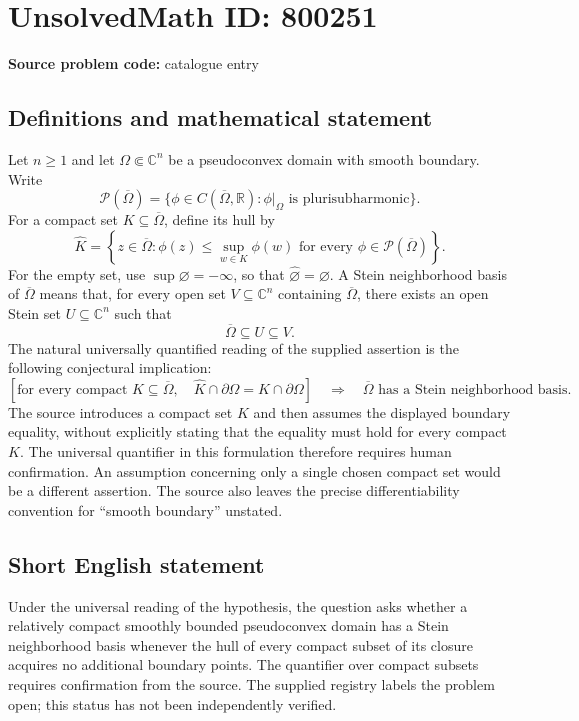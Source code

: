 \documentclass[11pt]{article}
\newcommand{\R}{\mathbb{R}}
\newcommand{\C}{\mathbb{C}}
\begin{document}
\section*{UnsolvedMath ID: 800251}
\textbf{Source problem code:} catalogue entry
\subsection{Definitions and mathematical statement}
Let \(n\geq 1\) and let \(\Omega\Subset\C^n\) be a pseudoconvex domain with smooth boundary. Write
\[
\mathcal P(\overline\Omega)=\{\phi\in C(\overline\Omega,\R):\phi|_\Omega\text{ is plurisubharmonic}\}.
\]
For a compact set \(K\subseteq\overline\Omega\), define its hull by
\[
\widehat K=\left\{z\in\overline\Omega:\phi(z)\leq\sup_{w\in K}\phi(w)\text{ for every }\phi\in\mathcal P(\overline\Omega)\right\}.
\]
For the empty set, use \(\sup\varnothing=-\infty\), so that \(\widehat\varnothing=\varnothing\).
A Stein neighborhood basis of \(\overline\Omega\) means that, for every open set \(V\subseteq\C^n\) containing \(\overline\Omega\), there exists an open Stein set \(U\subseteq\C^n\) such that
\[
\overline\Omega\subseteq U\subseteq V.
\]
The natural universally quantified reading of the supplied assertion is the following conjectural implication:
\[
\left[\text{for every compact }K\subseteq\overline\Omega,\quad
\widehat K\cap\partial\Omega=K\cap\partial\Omega\right]
\quad\Longrightarrow\quad
\overline\Omega\text{ has a Stein neighborhood basis}.
\]
The source introduces a compact set \(K\) and then assumes the displayed boundary equality, without explicitly stating that the equality must hold for every compact \(K\). The universal quantifier in this formulation therefore requires human confirmation. An assumption concerning only a single chosen compact set would be a different assertion. The source also leaves the precise differentiability convention for ``smooth boundary'' unstated.
\subsection{Short English statement}
Under the universal reading of the hypothesis, the question asks whether a relatively compact smoothly bounded pseudoconvex domain has a Stein neighborhood basis whenever the hull of every compact subset of its closure acquires no additional boundary points. The quantifier over compact subsets requires confirmation from the source. The supplied registry labels the problem open; this status has not been independently verified.
\end{document}
